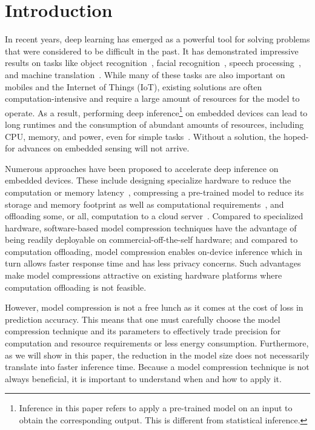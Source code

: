 \section{Introduction}
In recent years, deep learning has emerged as a powerful tool for solving problems that were considered to be difficult in the past. It has
demonstrated impressive results on tasks like object recognition~\cite{donahue14,he2016deep}, facial
recognition~\cite{parkhi2015deep,sun2014deep}, speech processing~\cite{pmlrv48amodei16}, and machine translation~\cite{bahdanau2014neural}.
While many of these tasks are also important on mobiles and the Internet of Things (IoT), existing solutions are often
computation-intensive and require a large amount of resources for the model to operate. As a result, performing deep
inference\footnote{Inference in this paper refers to apply a pre-trained model on an input to obtain the corresponding output. This is
different from statistical inference.} on embedded devices can lead to long runtimes and the consumption of abundant amounts of resources,
including CPU, memory, and power, even for simple tasks~\cite{CanzianiPC16}. Without a solution,
 the hoped-for advances on embedded sensing will not arrive.


Numerous approaches have been proposed to accelerate deep inference on embedded devices. These include designing specialize hardware to
reduce the computation or memory latency~\cite{georgiev2017low}, compressing a pre-trained model to reduce its storage and memory footprint
as well as computational requirements~\cite{han2016eie}, and offloading some, or all, computation to a cloud
server~\cite{Kang2017neurosurgeon,teerapittayanon2017distributed}. Compared to specialized hardware, software-based model compression
techniques have the advantage of being readily deployable on commercial-off-the-self hardware; and compared to computation offloading,
model compression enables on-device inference which in turn allows faster response time and has less privacy concerns. Such advantages make
model compressions attractive on existing hardware platforms where computation offloading is not feasible.


However, model compression is not a free lunch as it comes at the cost of loss in prediction accuracy. This
means that one must carefully choose the model compression technique and its parameters to effectively trade precision for computation and
resource requirements or less energy consumption. Furthermore, as we will show in this paper, the reduction in the model size does not
necessarily translate into faster inference time. Because a model compression technique is not always beneficial, it is important to
understand when and how to apply it.

